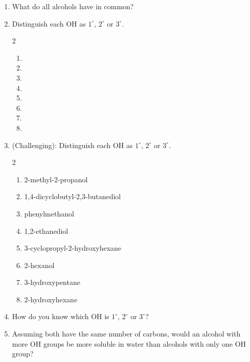\documentclass[12pt]{article}
\begin{document}
\begin{enumerate}[label=\arabic*.]
    \item What do all alcohols have in common?
    \vspace{1cm}
    \item Distinguish each OH as $1^{\circ}$, $2^{\circ}$ or $3^{\circ}$.
    \begin{multicols}{2}
    \begin{enumerate}[label=\alph*.]
        \item {}
        \item {}
        \item {}
        \item {}
        \item {}
        \item {}
        \item {}
        \item {}
    \end{enumerate}
    \end{multicols}
    \vspace{1cm}
    \item (Challenging): Distinguish each OH as $1^{\circ}$, $2^{\circ}$ or $3^{\circ}$.
    \begin{multicols}{2}
    \begin{enumerate}[label=\alph*.]
        \item 2-methyl-2-propanol
        \item 1,4-dicyclobutyl-2,3-butanediol
        \item phenylmethanol
        \item 1,2-ethanediol
        \item 3-cyclopropyl-2-hydroxyhexane
        \item 2-hexanol
        \item 3-hydroxypentane
        \item 2-hydroxyhexane
    \end{enumerate}
    \end{multicols}
    \vspace{1cm}
    \item How do you know which OH is $1^{\circ}$, $2^{\circ}$ or $3^{\circ}$?
    \vspace{1.5cm}
    \item Assuming both have the same number of carbons, would an alcohol with more OH groups be more soluble in water than alcohols with only one OH group?
    \vspace{1.5cm}
\end{enumerate}
\end{document}
